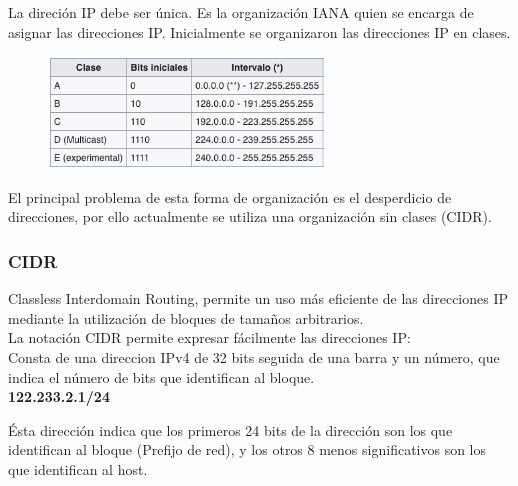 La direción IP debe ser única. Es la organización IANA quien se encarga de asignar las direcciones IP. Inicialmente se organizaron las direcciones IP en clases.

\begin{figure}[h]
\centering
\includegraphics[width=0.65\textwidth]{img/clasesIP.png}
\end{figure}

El principal problema de esta forma de organización es el desperdicio de direcciones, por ello actualmente se utiliza una organización sin clases (CIDR).
\subsubsection{CIDR}
Classless Interdomain Routing, permite un uso más eficiente de las direcciones IP mediante la utilización de bloques de tamaños arbitrarios.\\

La notación CIDR permite expresar fácilmente las direcciones IP:\\

Consta de una direccion IPv4 de 32 bits seguida de una barra y un número, que indica el número de bits que identifican al bloque.\\

{\centering
    \textbf{122.233.2.1/24}\\
}


Ésta dirección indica que los primeros 24 bits de la dirección son los que identifican al bloque (Prefijo de red), y los otros 8 menos significativos son los que identifican al host.\\
